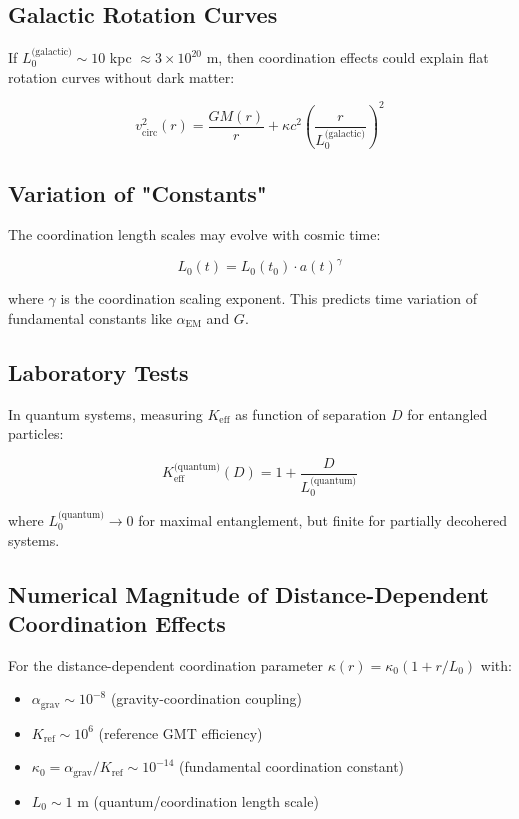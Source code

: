 \documentclass[11pt,a4paper]{article}
\begin{document}
\subsection{Galactic Rotation Curves}

If $L_0^{\text{(galactic)}} \sim 10$ kpc $\approx 3\times10^{20}$ m, then 
coordination effects could explain flat rotation curves without dark matter:

\begin{equation}
	v_{\text{circ}}^2(r) = \frac{GM(r)}{r} + \kappa c^2 \left(\frac{r}{L_0^{\text{(galactic)}}}\right)^2
\end{equation}

\subsection{Variation of "Constants"}

The coordination length scales may evolve with cosmic time:

\begin{equation}
	L_0(t) = L_0(t_0) \cdot a(t)^\gamma
\end{equation}

where $\gamma$ is the coordination scaling exponent. This predicts 
time variation of fundamental constants like $\alpha_{\text{EM}}$ and $G$.

\subsection{Laboratory Tests}

In quantum systems, measuring $K_{\mathrm{eff}}$ as function of 
separation $D$ for entangled particles:

\begin{equation}
	K_{\mathrm{eff}}^{\text{(quantum)}}(D) = 1 + \frac{D}{L_0^{\text{(quantum)}}}
\end{equation}

where $L_0^{\text{(quantum)}} \to 0$ for maximal entanglement, but 
finite for partially decohered systems.

\subsection{Numerical Magnitude of Distance-Dependent Coordination Effects}
\label{subsec:numerical-magnitudes}

For the distance-dependent coordination parameter $\kappa(r) = \kappa_0(1 + r/L_0)$ with:
\begin{itemize}
	\item $\alpha_{\text{grav}} \sim 10^{-8}$ (gravity-coordination coupling)
	\item $K_{\text{ref}} \sim 10^6$ (reference GMT efficiency)
	\item $\kappa_0 = \alpha_{\text{grav}}/K_{\text{ref}} \sim 10^{-14}$ (fundamental coordination constant)
	\item $L_0 \sim 1$ m (quantum/coordination length scale)
\end{itemize}
\end{document}
